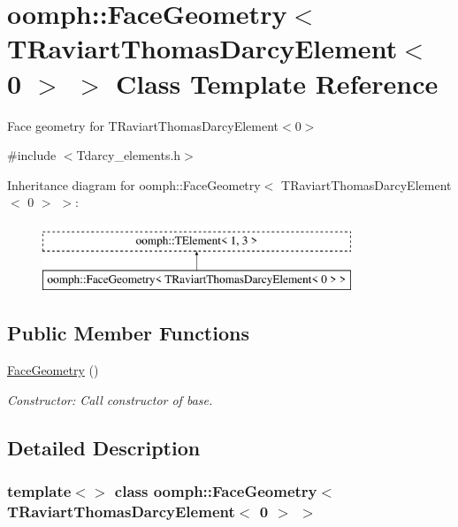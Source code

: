 \hypertarget{classoomph_1_1FaceGeometry_3_01TRaviartThomasDarcyElement_3_010_01_4_01_4}{}\section{oomph\+:\+:Face\+Geometry$<$ T\+Raviart\+Thomas\+Darcy\+Element$<$ 0 $>$ $>$ Class Template Reference}
\label{classoomph_1_1FaceGeometry_3_01TRaviartThomasDarcyElement_3_010_01_4_01_4}


Face geometry for T\+Raviart\+Thomas\+Darcy\+Element$<$0$>$  




{\ttfamily \#include $<$Tdarcy\+\_\+elements.\+h$>$}

Inheritance diagram for oomph\+:\+:Face\+Geometry$<$ T\+Raviart\+Thomas\+Darcy\+Element$<$ 0 $>$ $>$\+:\begin{figure}[H]
\begin{center}
\leavevmode
\includegraphics[height=2.000000cm]{classoomph_1_1FaceGeometry_3_01TRaviartThomasDarcyElement_3_010_01_4_01_4}
\end{center}
\end{figure}
\subsection*{Public Member Functions}
\begin{DoxyCompactItemize}
\item 
\hyperlink{classoomph_1_1FaceGeometry_3_01TRaviartThomasDarcyElement_3_010_01_4_01_4_ab845123757e35e20beae812a46340c25}{Face\+Geometry} ()
\begin{DoxyCompactList}\small\item\em Constructor\+: Call constructor of base. \end{DoxyCompactList}\end{DoxyCompactItemize}


\subsection{Detailed Description}
\subsubsection*{template$<$$>$\newline
class oomph\+::\+Face\+Geometry$<$ T\+Raviart\+Thomas\+Darcy\+Element$<$ 0 $>$ $>$}

